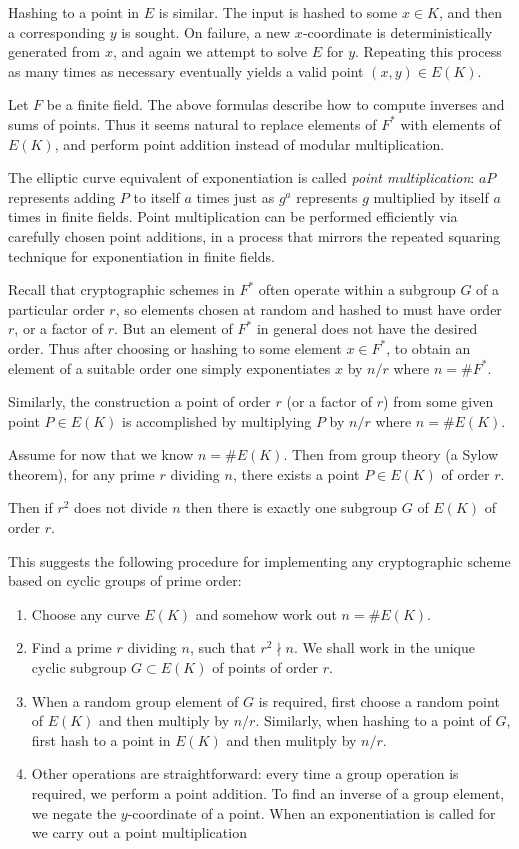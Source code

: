 Hashing to a point in $E$ is similar. The input is hashed to some
$x \in K$, and then a corresponding $y$ is sought. On failure,
a new $x$-coordinate is deterministically generated from $x$, and again
we attempt to solve $E$ for $y$. Repeating this process as many times as
necessary eventually yields a valid point $(x,y) \in E(K)$.

Let $F$ be a finite field.
The above formulas describe how to compute inverses and sums of
points. Thus it seems natural to replace elements of $F^*$
with elements of $E(K)$, and perform
point addition instead of modular multiplication.

The elliptic curve
equivalent of exponentiation is called
\emph{point multiplication}: $a P$ represents
adding $P$ to itself $a$ times just as $g^a$ represents $g$ multiplied
by itself $a$ times in finite fields.
Point multiplication can be performed efficiently via carefully
chosen point
additions, in a process that mirrors the repeated squaring technique
for exponentiation in finite fields.

Recall that cryptographic schemes in $F^*$ often operate
within a subgroup $G$ of a particular order $r$,
so elements chosen at random and hashed to must have
order $r$, or a factor of $r$. But an element of $F^*$
in general does not have the desired order.
Thus after choosing or hashing to some element $x \in F^*$,
to obtain an element of a suitable order one simply exponentiates $x$
by $n / r$ where $n = \#F^*$.

Similarly, the construction a point of order $r$ (or a factor of $r$)
from some given point $P \in E(K)$ is accomplished by multiplying $P$ by
$n / r$ where $n = \#E(K)$.

Assume for now that we know $n = \#E(K)$. Then from group theory (a
Sylow theorem), for any prime $r$ dividing $n$,
there exists a point $P \in E(K)$ of order $r$.

Then if $r^2$ does not divide $n$ then there is exactly one
subgroup $G$ of $E(K)$ of order $r$.

This suggests the following procedure for implementing any cryptographic
scheme based on cyclic groups of prime order:

\begin{enumerate}
\item
Choose any curve $E(K)$ and somehow work out $n = \#E(K)$.
\item
Find a prime $r$ dividing $n$, such that $r^2 \nmid n$.
We shall work in the unique cyclic subgroup $G \subset E(K)$ of points
of order $r$.
\item
When a random group element of $G$ is required, first choose a random point
of $E(K)$ and then multiply by $n / r$. Similarly, when hashing to
a point of $G$, first hash to a point in $E(K)$ and then mulitply by
$n / r$.
\item
Other operations are straightforward: every time a group
operation is required, we perform a point addition. To find an inverse
of a group element, we negate the $y$-coordinate of a point. When
an exponentiation is called for we carry out a point multiplication
\end{enumerate}

